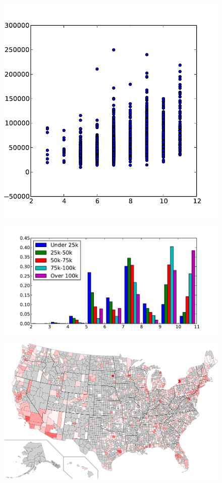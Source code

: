 \documentclass{sig-alternate-10pt}
\begin{document}
\begin{figure}
\centering
        \includegraphics[width=0.9\linewidth]{figs/maxIncome_maxDown.pdf}
  \caption{}
  \label{fig:services-incomeVsDown}
\end{figure}

\begin{figure}
\centering
        \includegraphics[width=0.9\linewidth]{figs/all_hist.pdf}
  \caption{}
  \label{fig:services-hist}
\end{figure}

\begin{figure}
\centering
        \includegraphics[width=0.9\linewidth]{figs/counties_btMaxDown.pdf}
  \caption{}
  \label{fig:services-btMaxDown}
\end{figure}
\end{document}
